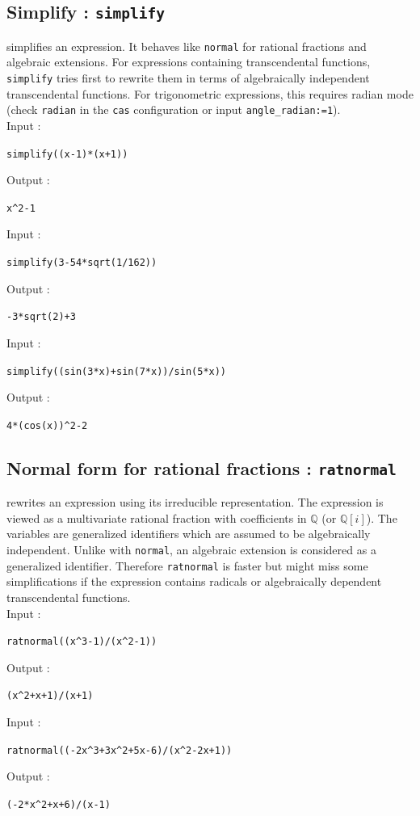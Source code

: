 \documentclass[a4paper,11pt]{book}
\begin{document}
\subsection{Simplify : {\tt simplify}}
 simplifies an expression. It behaves
like {\tt normal} for rational fractions and algebraic extensions. 
For expressions
containing transcendental functions, {\tt simplify} tries first to rewrite
them in terms of algebraically independent transcendental functions.
For trigonometric expressions, this requires radian mode
(check {\tt radian} in the {\tt cas}
configuration or input {\tt angle\_radian:=1}).\\
Input :  
\begin{center}{\tt simplify((x-1)*(x+1))}\end{center}
Output :
 \begin{center}{\tt x\verb|^|2-1}\end{center}  
Input :  
\begin{center}{\tt simplify(3-54*sqrt(1/162))}\end{center}
Output :
 \begin{center}{\tt -3*sqrt(2)+3}\end{center} 
Input :
\begin{center}{\tt simplify((sin(3*x)+sin(7*x))/sin(5*x))}\end{center}
Output :
\begin{center}{\tt 4*(cos(x))\verb|^|2-2}\end{center}
 
\subsection{Normal form for rational fractions : {\tt ratnormal}}
 rewrites an expression using
its irreducible representation. The expression is viewed
as a multivariate rational fraction with 
coefficients in $\mathbb Q$ (or $\mathbb Q[i]$). The variables are
generalized identifiers which are assumed to be algebraically independent.
Unlike with {\tt normal}, an algebraic extension
is considered as a generalized identifier. Therefore {\tt ratnormal}
is faster but might miss some simplifications if
the expression contains radicals or algebraically dependent transcendental
functions.\\
Input :  
\begin{center}{\tt ratnormal((x\verb|^|3-1)/(x\verb|^|2-1))}\end{center}
Output :
 \begin{center}{\tt (x\verb|^|2+x+1)/(x+1)}\end{center}  
Input :  
\begin{center}{\tt ratnormal((-2x\verb|^|3+3x\verb|^|2+5x-6)/(x\verb|^|2-2x+1))}\end{center}
Output :
 \begin{center}{\tt (-2*x\verb|^|2+x+6)/(x-1)}\end{center} 
\end{document}
